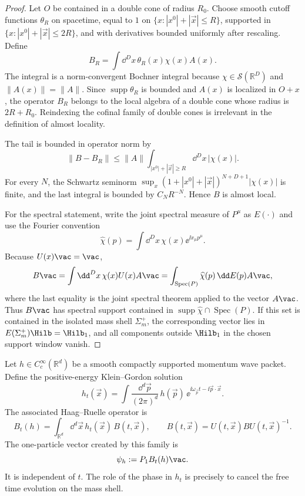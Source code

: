 \begin{proof}
Let \(O\) be contained in a double cone of radius \(R_0\).  Choose smooth
cutoff functions \(\theta_R\) on spacetime, equal to \(1\) on
\(\{x:|x^0|+|\vec x|\le R\}\), supported in
\(\{x:|x^0|+|\vec x|\le 2R\}\), and with derivatives bounded uniformly after
rescaling.  Define
\[
  B_R=\int \dd^Dx\,\theta_R(x)\chi(x)A(x).
\]
The integral is a norm-convergent Bochner integral because
\(\chi\in\mathcal S(\mathbb R^D)\) and \(\|A(x)\|=\|A\|\).  Since
\(\operatorname{supp}\theta_R\) is bounded and \(A(x)\) is localized in
\(O+x\), the operator \(B_R\) belongs to the local algebra of a double cone
whose radius is \(2R+R_0\).  Reindexing the cofinal family of double cones is
irrelevant in the definition of almost locality.

The tail is bounded in operator norm by
\[
  \|B-B_R\|
  \le
  \|A\|\int_{|x^0|+|\vec x|\ge R}\dd^Dx\,|\chi(x)|.
\]
For every \(N\), the Schwartz seminorm
\(\sup_x(1+|x^0|+|\vec x|)^{N+D+1}|\chi(x)|\) is finite, and the last integral
is bounded by \(C_N R^{-N}\).  Hence \(B\) is almost local.

For the spectral statement, write the joint spectral measure of \(P^\mu\) as
\(E(\cdot)\) and use the Fourier convention
\[
  \widehat\chi(p)=\int\dd^Dx\,\chi(x)\ee^{\ii x_\mu p^\mu}.
\]
Because \(U(x)\vac=\vac\),
\[
  B\vac
  =
  \int\dd^Dx\,\chi(x)U(x)A\vac
  =
  \int_{\operatorname{Spec}(P)}\widehat\chi(p)\,\dd E(p)A\vac ,
\]
where the last equality is the joint spectral theorem applied to the vector
\(A\vac\).  Thus \(B\vac\) has spectral support contained in
\(\operatorname{supp}\widehat\chi\cap\operatorname{Spec}(P)\).  If this set is
contained in the isolated mass shell \(\Sigma_m^+\), the corresponding vector
lies in \(E(\Sigma_m^+)\Hilb=\Hilb_1\), and all components outside
\(\Hilb_1\) in the chosen support window vanish.
\end{proof}

Let \(h\in C_c^\infty(\mathbb R^d)\) be a smooth compactly supported momentum
wave packet. Define the positive-energy Klein--Gordon solution
\[
  h_t(\vec x)
  =
  \int\frac{\dd^d\vec p}{(2\pi)^d}\,
  h(\vec p)\,
  \ee^{\ii\omega_{\vec p}t-\ii\vec p\cdot\vec x}.
\]
The associated Haag--Ruelle operator is
\[
  B_t(h)
  =
  \int_{\mathbb R^d}\dd^d\vec x\,
  h_t(\vec x)\,B(t,\vec x),
  \qquad
  B(t,\vec x)=U(t,\vec x)BU(t,\vec x)^{-1}.
\]
The one-particle vector created by this family is
\[
  \psi_h:=P_1B_t(h)\vac .
\]
It is independent of \(t\). The role of the phase in \(h_t\) is precisely to
cancel the free time evolution on the mass shell.

